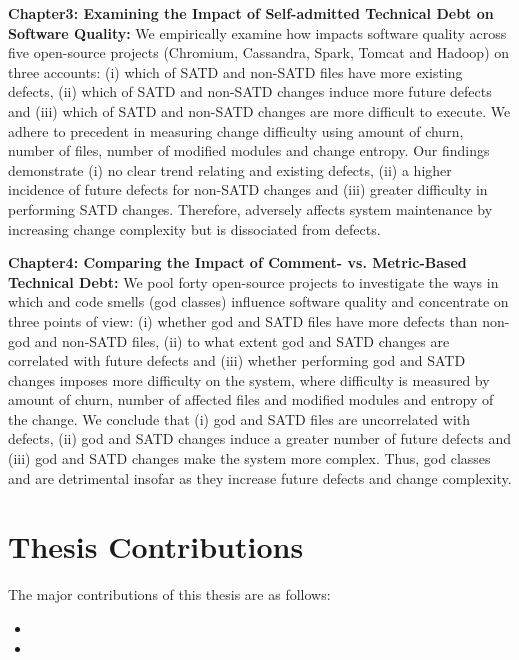 \textbf{Chapter3: Examining the Impact of Self-admitted Technical Debt on Software Quality:} We empirically examine how \SATD impacts software quality across five open-source projects (Chromium, Cassandra, Spark, Tomcat and Hadoop) on three accounts: (i) which of SATD and non-SATD files have more existing defects, (ii) which of SATD and non-SATD changes induce more future defects and (iii) which of SATD and non-SATD changes are more difficult to execute. We adhere to precedent in measuring change difficulty using amount of churn, number of files, number of modified modules and change entropy. Our findings demonstrate (i) no clear trend relating \SATD and existing defects, (ii) a higher incidence of future defects for non-SATD changes and (iii) greater difficulty in performing SATD changes. Therefore, \SATD adversely affects system maintenance by increasing change complexity but is dissociated from defects.

\textbf{Chapter4: Comparing the Impact of Comment- vs. Metric-Based Technical Debt:} We pool forty open-source projects to investigate the ways in which \SATD and code smells (god classes) influence software quality and concentrate on three points of view: (i) whether god and SATD files have more defects than non-god and non-SATD files, (ii) to what extent god and SATD changes are correlated with future defects and (iii) whether performing god and SATD changes imposes more difficulty on the system, where difficulty is measured by amount of churn, number of affected files and modified modules and entropy of the change. We conclude that (i) god and SATD files are uncorrelated with defects, (ii) god and SATD changes induce a greater number of future defects and (iii) god and SATD changes make the system more complex. Thus, god classes and \SATD are detrimental insofar as they increase future defects and change complexity.

\section{Thesis Contributions}
The major contributions of this thesis are as follows:
\begin{itemize}
	\item 
	\item
\end{itemize}